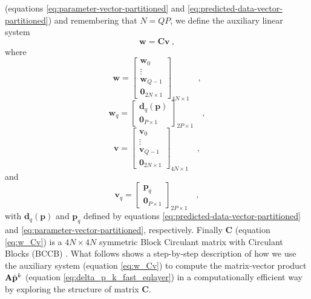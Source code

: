 (equations \ref{eq:parameter-vector-partitioned} and \ref{eq:predicted-data-vector-partitioned}) 
and remembering that $N = QP$, we define the auxiliary linear system
\begin{equation}
\mathbf{w} = \mathbf{C} \mathbf{v} \: ,
\label{eq:w_Cv}
\end{equation}
where
\begin{equation}
\mathbf{w} = \begin{bmatrix}
\mathbf{w}_{0} \\
\vdots \\
\mathbf{w}_{Q - 1} \\
\mathbf{0}_{2N \times 1}
\end{bmatrix}_{4N \times 1} \quad ,
\label{eq:w-vector}
\end{equation}
\begin{equation}
\mathbf{w}_{q} = \begin{bmatrix}
\mathbf{d}_{q}(\mathbf{p}) \\
\mathbf{0}_{P \times 1}
\end{bmatrix}_{2P \times 1}
\label{eq:wq-vector} \quad ,
\end{equation}
\begin{equation}
\mathbf{v} = \begin{bmatrix}
\mathbf{v}_{0} \\
\vdots \\
\mathbf{v}_{Q - 1} \\
\mathbf{0}_{2N \times 1}
\end{bmatrix}_{4N \times 1} \quad ,
\label{eq:v-vector}
\end{equation}
and
\begin{equation}
\mathbf{v}_{q} = \begin{bmatrix}
\mathbf{p}_{q} \\
\mathbf{0}_{P \times 1}
\end{bmatrix}_{2P \times 1}
\label{eq:vq-vector} \quad ,
\end{equation}
with $\mathbf{d}_{q}(\mathbf{p})$ and $\mathbf{p}_{q}$ defined by
equations \ref{eq:predicted-data-vector-partitioned} and 
\ref{eq:parameter-vector-partitioned}, respectively.
Finally $\mathbf{C}$ (equation \ref{eq:w_Cv}) is a 
$4N \times 4N$ symmetric Block Circulant matrix with Circulant Blocks (BCCB) 
\citep[][ p. 184]{davis1979}.
What follows shows a step-by-step description of how we use the auxiliary 
system (equation \ref{eq:w_Cv}) to compute the matrix-vector product 
$\tensor{A} \hat{\mathbf{p}}^{k}$ (equation \ref{eq:delta_p_k_fast_eqlayer}) in 
a computationally efficient way by exploring the structure of matrix $\mathbf{C}$.

